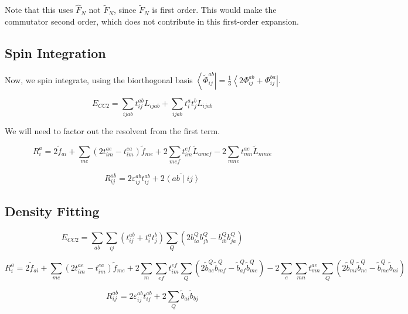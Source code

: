 \documentclass{article}
\begin{document}
Note that this uses $\hat{F}_N$ not $\tilde{F}_N$, since $\tilde{F}_N$ is first order. This would make the commutator second order, which does not contribute in this first-order expansion.

\subsection{Spin Integration}

Now, we spin integrate, using the biorthogonal basis $\left<\tilde{\Phi}_{ij}^{ab}\right| = \frac{1}{3}\left<2\Phi_{ij}^{ab} + \Phi_{ij}^{ba}\right|$.

\begin{equation}
  E_{CC2} = \sum_{ijab} t_{ij}^{ab}L_{ijab} + \sum_{ijab}t_i^at_j^bL_{ijab}
\end{equation}

We will need to factor out the resolvent from the first term.

\begin{equation}
  R_i^a = 2\tilde{f}_{ai} + \sum_{me}\left(2t_{im}^{ae} - t_{im}^{ea}\right)\tilde{f}_{me} + 2\sum_{mef}t_{im}^{ef}\tilde{L}_{amef} - 2\sum_{mne}t_{mn}^{ae}\tilde{L}_{mnie}
\end{equation}

\begin{equation}
  R_{ij}^{ab} = 2\varepsilon_{ij}^{ab}t_{ij}^{ab} + 2\tilde{\left<ab\middle|ij\right>}
\end{equation}

\subsection{Density Fitting}

\begin{equation}
  E_{CC2} = \sum_{ab}\sum_{ij}\left(t_{ij}^{ab} + t_i^at_j^b\right)\sum_Q\left(2b_{ia}^Qb_{jb}^Q - b_{ib}^Qb_{ja}^Q\right)
\end{equation}

\begin{equation}
  R_i^a = 2\tilde{f}_{ai} + \sum_{me}\left(2t_{im}^{ae} - t_{im}^{ea}\right)\tilde{f}_{me} + 2\sum_m\sum_{ef}t_{im}^{ef}\sum_Q\left(2\tilde{b}_{ae}^Q\tilde{b}_{mf}^Q - \tilde{b}_{af}^Q \tilde{b}_{me}^Q\right) - 2\sum_e\sum_{mn}t_{mn}^{ae}\sum_Q\left(2\tilde{b}_{mi}^Q\tilde{b}_{ne}^Q - \tilde{b}_{me}^Q\tilde{b}_{ni}\right)
\end{equation}

\begin{equation}
  R_{ij}^{ab} = 2\varepsilon_{ij}^{ab}t_{ij}^{ab} + 2\sum_Q\tilde{b}_{ai}\tilde{b}_{bj}
\end{equation}
\end{document}
